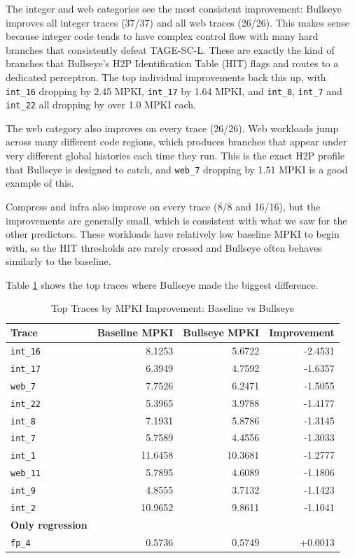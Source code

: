 \documentclass[11pt,a4paper]{article}
\begin{document}
The integer and web categories see the most consistent improvement: Bullseye improves
all integer traces (37/37) and all web traces (26/26). This makes sense because integer
code tends to have complex control flow with many hard branches that consistently defeat
TAGE-SC-L. These are exactly the kind of branches that Bullseye's H2P Identification
Table (HIT) flags and routes to a dedicated perceptron. The top individual improvements
back this up, with \texttt{int\_16} dropping by 2.45 MPKI, \texttt{int\_17} by 1.64
MPKI, and \texttt{int\_8}, \texttt{int\_7} and \texttt{int\_22} all dropping by
over 1.0 MPKI each.

The web category also improves on every trace (26/26). Web workloads jump 
across many different code regions, which produces branches that appear under 
very different global histories each time they run. This is the exact H2P profile 
that Bullseye is designed to catch, and \texttt{web\_7} dropping by 1.51 MPKI 
is a good example of this.

Compress and infra also improve on every trace (8/8 and 16/16), but the improvements
are generally small, which is consistent with what we saw for the other predictors.
These workloads have relatively low baseline MPKI to begin with, so the HIT thresholds
are rarely crossed and Bullseye often behaves similarly to the baseline.

Table \ref{tab:bullseye_top} shows the top traces where Bullseye made the 
biggest difference.

\begin{table}[H]
\centering
\caption{Top Traces by MPKI Improvement: Baseline vs Bullseye}
\label{tab:bullseye_top}
\begin{tabular}{lrrr}
\toprule
\textbf{Trace} & \textbf{Baseline MPKI} & \textbf{Bullseye MPKI} & 
\textbf{Improvement} \\
\midrule
\texttt{int\_16}  & 8.1253 & 5.6722 & -2.4531 \\
\texttt{int\_17}  & 6.3949 & 4.7592 & -1.6357 \\
\texttt{web\_7}   & 7.7526 & 6.2471 & -1.5055 \\
\texttt{int\_22}  & 5.3965 & 3.9788 & -1.4177 \\
\texttt{int\_8}   & 7.1931 & 5.8786 & -1.3145 \\
\texttt{int\_7}   & 5.7589 & 4.4556 & -1.3033 \\
\texttt{int\_1}   & 11.6458 & 10.3681 & -1.2777 \\
\texttt{web\_11}  & 5.7895 & 4.6089 & -1.1806 \\
\texttt{int\_9}   & 4.8555 & 3.7132 & -1.1423 \\
\texttt{int\_2}   & 10.9652 & 9.8611 & -1.1041 \\
\midrule
\textbf{Only regression} & & & \\
\texttt{fp\_4}    & 0.5736 & 0.5749 & +0.0013 \\
\bottomrule
\end{tabular}
\end{table}
\end{document}

